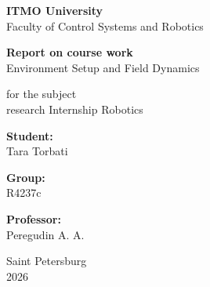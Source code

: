 \begin{titlepage}
    
    \fontsize{14pt}{18pt}\selectfont
    \centering
    
    \textbf{ITMO University} \\
    \vspace{0.5cm}
    Faculty of Control Systems and Robotics
    
    \vfill
    
    \textbf{Report on course work} \\
    \vspace{0.3cm}
    \guillemotleft Environment Setup and Field Dynamics\guillemotright
    
    \vspace{1.5cm}
    
    for the subject \\
    \guillemotleft research Internship Robotics\guillemotright
    
    \vfill


    \begin{flushright}
        \textbf{Student:} \\
        Tara Torbati \\
        \vspace{0.3cm}

        \textbf{Group:} \\
        R4237c \\
        \vspace{0.4cm}
        
        \textbf{Professor:} \\
        Peregudin A. A.
    \end{flushright}
    
    \vfill
    
    Saint Petersburg \\ 2026
\end{titlepage}